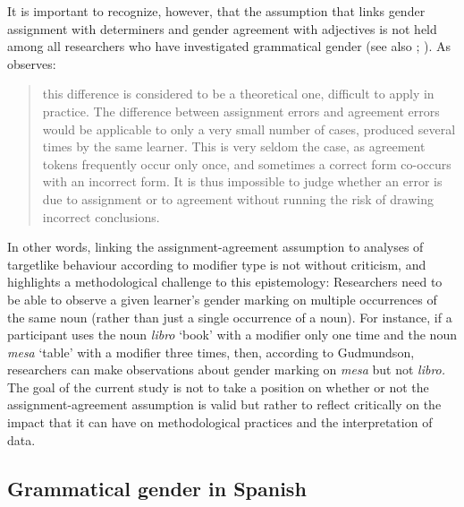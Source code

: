 \documentclass[output=paper,colorlinks,citecolor=brown,modfonts,nonflat]{../langscibook}
\begin{document}
It is important to recognize, however, that the assumption that links gender assignment with determiners and gender agreement with adjectives is not held among all researchers who have investigated grammatical gender (see also \citealt{GaravitoWhite2002}; \citealt[510]{MontrulEtAl2008}). As \citet{Gudmundson2013} observes: 


\begin{quote}
this difference is considered to be a theoretical one, difficult to apply in practice. The difference between assignment errors and agreement errors would be applicable to only a very small number of cases, produced several times by the same learner. This is very seldom the case, as agreement tokens frequently occur only once, and sometimes a correct form co-occurs with an incorrect form. It is thus impossible to judge whether an error is due to assignment or to agreement without running the risk of drawing incorrect conclusions. \citep[242]{Gudmundson2013}
\end{quote}


In other words, linking the assignment-agreement assumption to analyses of targetlike behaviour according to modifier type is not without criticism, and \citeauthor{Gudmundson2013} highlights a methodological challenge to this epistemology: Researchers need to be able to observe a given learner’s gender marking on multiple occurrences of the same noun (rather than just a single occurrence of a noun). For instance, if a participant uses the noun \textit{libro} ‘book’ with a modifier only one time and the noun \textit{mesa} ‘table’ with a modifier three times, then, according to Gudmundson, researchers can make observations about gender marking on \textit{mesa} but not \textit{libro.} The goal of the current study is not to take a position on whether or not the assignment-agreement assumption is valid but rather to reflect critically on the impact that it can have on methodological practices and the interpretation of data.


\subsection{Grammatical gender in Spanish}\label{sec:gudmestad:2.3}
\end{document}
